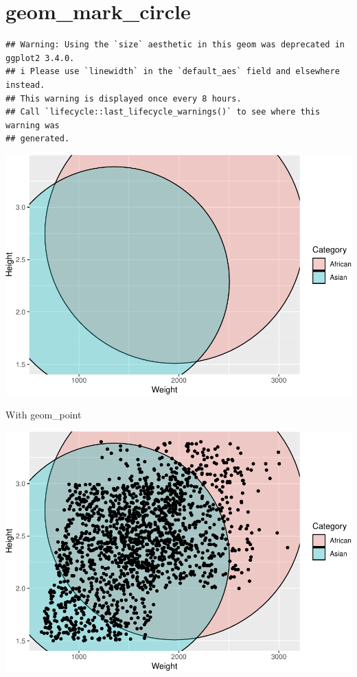 \documentclass[
]{book}
\begin{document}
\hypertarget{geom_mark_circle}{%
\section{geom\_mark\_circle}\label{geom_mark_circle}}

\begin{verbatim}
## Warning: Using the `size` aesthetic in this geom was deprecated in ggplot2 3.4.0.
## i Please use `linewidth` in the `default_aes` field and elsewhere instead.
## This warning is displayed once every 8 hours.
## Call `lifecycle::last_lifecycle_warnings()` to see where this warning was
## generated.
\end{verbatim}

\includegraphics{Data-Visualisation-geom-Encyclopedia_files/figure-latex/unnamed-chunk-43-1.pdf}

With geom\_point

\includegraphics{Data-Visualisation-geom-Encyclopedia_files/figure-latex/unnamed-chunk-44-1.pdf}
\end{document}
